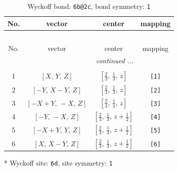 \documentclass[fleqn,8pt]{jsarticle}
\begin{document}
\renewcommand{\arraystretch}{1.2}
\begin{longtable}{cccc}
\caption{Wyckoff bond: {\tt 6b@2c}, bond symmetry: {\tt 1}}
 \\
 \hline \hline
No. & vector & center & mapping \\ \hline \endfirsthead

\multicolumn{3}{l}{\tablename\ \thetable{}} \\
 \hline \hline
No. & vector & center & mapping \\ \hline \endhead

 \hline \hline
\multicolumn{3}{r}{\footnotesize\it continued ...} \\ \endfoot

 \hline \hline
\multicolumn{3}{r}{} \\ \endlastfoot

1 & $\left[ X,\, Y,\, Z \right]$ & $\left[ \frac{2}{3},\, \frac{1}{3},\, z \right]$ & {\tt [1]} \\ \hline
2 & $\left[ - Y,\, X - Y,\, Z \right]$ & $\left[ \frac{2}{3},\, \frac{1}{3},\, z \right]$ & {\tt [2]} \\ \hline
3 & $\left[ - X + Y,\, - X,\, Z \right]$ & $\left[ \frac{2}{3},\, \frac{1}{3},\, z \right]$ & {\tt [3]} \\ \hline
4 & $\left[ - Y,\, - X,\, Z \right]$ & $\left[ \frac{2}{3},\, \frac{1}{3},\, z + \frac{1}{2} \right]$ & {\tt [4]} \\ \hline
5 & $\left[ - X + Y,\, Y,\, Z \right]$ & $\left[ \frac{2}{3},\, \frac{1}{3},\, z + \frac{1}{2} \right]$ & {\tt [5]} \\ \hline
6 & $\left[ X,\, X - Y,\, Z \right]$ & $\left[ \frac{2}{3},\, \frac{1}{3},\, z + \frac{1}{2} \right]$ & {\tt [6]} \\
\end{longtable}
* Wyckoff site: {\tt 6d}, site symmetry: {\tt 1}
\renewcommand{\arraystretch}{1.2}
\end{document}
